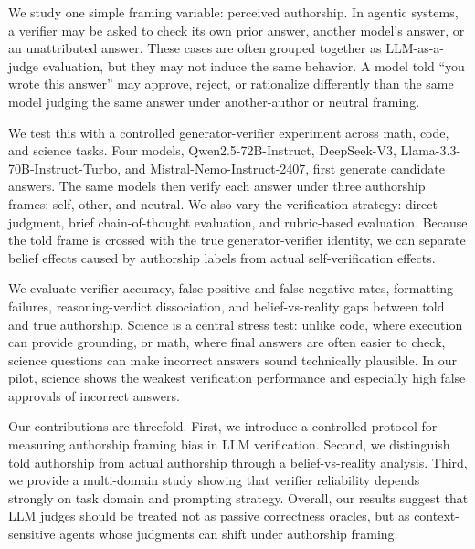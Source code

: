 \documentclass{article}
\begin{document}
We study one simple framing variable: perceived authorship. In agentic systems, a verifier may be asked to check its own prior answer, another model's answer, or an unattributed answer. These cases are often grouped together as LLM-as-a-judge evaluation, but they may not induce the same behavior. A model told ``you wrote this answer'' may approve, reject, or rationalize differently than the same model judging the same answer under another-author or neutral framing.

We test this with a controlled generator-verifier experiment across math, code, and science tasks. Four models, Qwen2.5-72B-Instruct, DeepSeek-V3, Llama-3.3-70B-Instruct-Turbo, and Mistral-Nemo-Instruct-2407, first generate candidate answers. The same models then verify each answer under three authorship frames: self, other, and neutral. We also vary the verification strategy: direct judgment, brief chain-of-thought evaluation, and rubric-based evaluation. Because the told frame is crossed with the true generator-verifier identity, we can separate belief effects caused by authorship labels from actual self-verification effects.

We evaluate verifier accuracy, false-positive and false-negative rates, formatting failures, reasoning-verdict dissociation, and belief-vs-reality gaps between told and true authorship. Science is a central stress test: unlike code, where execution can provide grounding, or math, where final answers are often easier to check, science questions can make incorrect answers sound technically plausible. In our pilot, science shows the weakest verification performance and especially high false approvals of incorrect answers.

Our contributions are threefold. First, we introduce a controlled protocol for measuring authorship framing bias in LLM verification. Second, we distinguish told authorship from actual authorship through a belief-vs-reality analysis. Third, we provide a multi-domain study showing that verifier reliability depends strongly on task domain and prompting strategy. Overall, our results suggest that LLM judges should be treated not as passive correctness oracles, but as context-sensitive agents whose judgments can shift under authorship framing.



\end{document}
